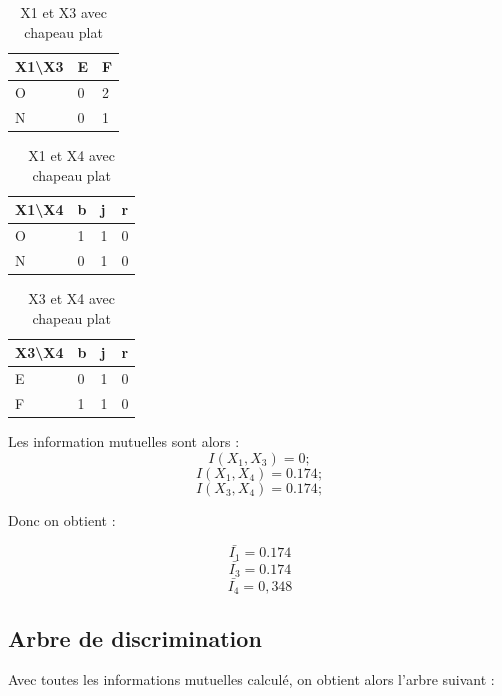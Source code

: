 \documentclass{article}
\begin{document}
\begin{table}[H]
  \centering
  \caption{X1 et X3 avec chapeau plat}
  \begin{tabular}{|l|l|l|}
  \hline
  X1\textbackslash{}X3 & E & F \\ \hline
  O                    & 0 & 2 \\ \hline
  N                    & 0 & 1 \\ \hline
  \end{tabular}
\end{table}

\begin{table}[h]
  \centering
  \caption{X1 et X4 avec chapeau plat}
  \begin{tabular}{|l|l|l|l|}
  \hline
  X1\textbackslash{}X4 & b & j & r \\ \hline
  O                    & 1 & 1 & 0 \\ \hline
  N                    & 0 & 1 & 0 \\ \hline
  \end{tabular}
\end{table}

\begin{table}[h]
  \centering
  \caption{X3 et X4 avec chapeau plat}
  \begin{tabular}{|l|l|l|l|}
  \hline
  X3\textbackslash{}X4 & b & j & r \\ \hline
  E                    & 0 & 1 & 0 \\ \hline
  F                    & 1 & 1 & 0 \\ \hline
  \end{tabular}
\end{table}

Les information mutuelles sont alors :
\[
I(X_1,X_3)= 0;
\]
\[
I(X_1,X_4)= 0.174 ;
\]
\[
I(X_3,X_4)= 0.174 ;
\]

Donc on obtient :

\[
\bar{I_1}= 0.174
\]
\[
\bar{I_3}= 0.174
\]
\[
\bar{I_4}= 0,348
\]


\subsection{Arbre de discrimination}

Avec toutes les informations mutuelles calculé, on obtient alors l'arbre suivant :
\end{document}
